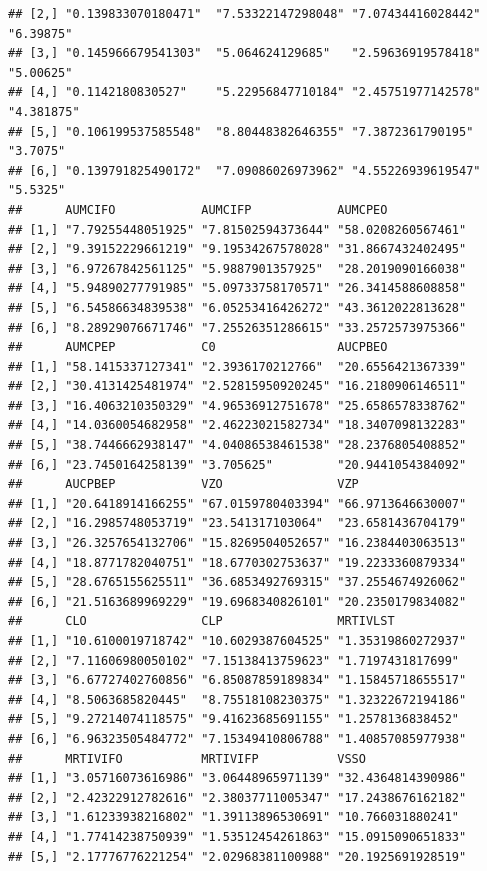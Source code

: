 \documentclass[]{krantz}
\theoremstyle{definition}
\theoremstyle{definition}
\theoremstyle{definition}
\theoremstyle{remark}
\begin{document}
\begin{verbatim}
## [2,] "0.139833070180471"  "7.53322147298048" "7.07434416028442" "6.39875" 
## [3,] "0.145966679541303"  "5.064624129685"   "2.59636919578418" "5.00625" 
## [4,] "0.1142180830527"    "5.22956847710184" "2.45751977142578" "4.381875"
## [5,] "0.106199537585548"  "8.80448382646355" "7.3872361790195"  "3.7075"  
## [6,] "0.139791825490172"  "7.09086026973962" "4.55226939619547" "5.5325"  
##      AUMCIFO            AUMCIFP            AUMCPEO           
## [1,] "7.79255448051925" "7.81502594373644" "58.0208260567461"
## [2,] "9.39152229661219" "9.19534267578028" "31.8667432402495"
## [3,] "6.97267842561125" "5.9887901357925"  "28.2019090166038"
## [4,] "5.94890277791985" "5.09733758170571" "26.3414588608858"
## [5,] "6.54586634839538" "6.05253416426272" "43.3612022813628"
## [6,] "8.28929076671746" "7.25526351286615" "33.2572573975366"
##      AUMCPEP            C0                 AUCPBEO           
## [1,] "58.1415337127341" "2.3936170212766"  "20.6556421367339"
## [2,] "30.4131425481974" "2.52815950920245" "16.2180906146511"
## [3,] "16.4063210350329" "4.96536912751678" "25.6586578338762"
## [4,] "14.0360054682958" "2.46223021582734" "18.3407098132283"
## [5,] "38.7446662938147" "4.04086538461538" "28.2376805408852"
## [6,] "23.7450164258139" "3.705625"         "20.9441054384092"
##      AUCPBEP            VZO                VZP               
## [1,] "20.6418914166255" "67.0159780403394" "66.9713646630007"
## [2,] "16.2985748053719" "23.541317103064"  "23.6581436704179"
## [3,] "26.3257654132706" "15.8269504052657" "16.2384403063513"
## [4,] "18.8771782040751" "18.6770302753637" "19.2233360879334"
## [5,] "28.6765155625511" "36.6853492769315" "37.2554674926062"
## [6,] "21.5163689969229" "19.6968340826101" "20.2350179834082"
##      CLO                CLP                MRTIVLST          
## [1,] "10.6100019718742" "10.6029387604525" "1.35319860272937"
## [2,] "7.11606980050102" "7.15138413759623" "1.7197431817699" 
## [3,] "6.67727402760856" "6.85087859189834" "1.15845718655517"
## [4,] "8.5063685820445"  "8.75518108230375" "1.32322672194186"
## [5,] "9.27214074118575" "9.41623685691155" "1.2578136838452" 
## [6,] "6.96323505484772" "7.15349410806788" "1.40857085977938"
##      MRTIVIFO           MRTIVIFP           VSSO              
## [1,] "3.05716073616986" "3.06448965971139" "32.4364814390986"
## [2,] "2.42322912782616" "2.38037711005347" "17.2438676162182"
## [3,] "1.61233938216802" "1.39113896530691" "10.766031880241" 
## [4,] "1.77414238750939" "1.53512454261863" "15.0915090651833"
## [5,] "2.17776776221254" "2.02968381100988" "20.1925691928519"

\end{verbatim}
\end{document}
